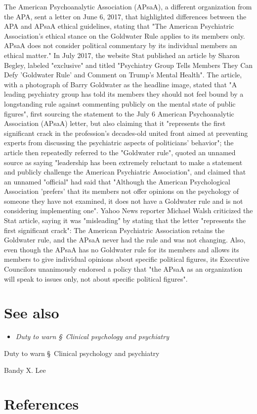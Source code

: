 The American Psychoanalytic Association (APsaA), a different
organization from the APA, sent a letter on June 6, 2017, that
highlighted differences between the APA and APsaA ethical guidelines,
stating that "The American Psychiatric Association's ethical stance on
the Goldwater Rule applies to its members only. APsaA does not consider
political commentary by its individual members an ethical matter." In
July 2017, the website Stat published an article by Sharon Begley,
labeled "exclusive" and titled "Psychiatry Group Tells Members They Can
Defy 'Goldwater Rule' and Comment on Trump's Mental Health". The
article, with a photograph of Barry Goldwater as the headline image,
stated that "A leading psychiatry group has told its members they should
not feel bound by a longstanding rule against commenting publicly on the
mental state of public figures", first sourcing the statement to the
July 6 American Psychoanalytic Association (APsaA) letter, but also
claiming that it "represents the first significant crack in the
profession's decades-old united front aimed at preventing experts from
discussing the psychiatric aspects of politicians' behavior"; the
article then repeatedly referred to the "Goldwater rule", quoted an
unnamed source as saying "leadership has been extremely reluctant to
make a statement and publicly challenge the American Psychiatric
Association", and claimed that an unnamed "official" had said that
"Although the American Psychological Association 'prefers' that its
members not offer opinions on the psychology of someone they have not
examined, it does not have a Goldwater rule and is not considering
implementing one". Yahoo News reporter Michael Walsh criticized the Stat
article, saying it was "misleading" by stating that the letter
"represents the first significant crack": The American Psychiatric
Association retains the Goldwater rule, and the APsaA never had the rule
and was not changing. Also, even though the APsaA has no Goldwater rule
for its members and allows its members to give individual opinions about
specific political figures, its Executive Councilors unanimously
endorsed a policy that "the APsaA as an organization will speak to
issues only, not about specific political figures".

\section{See also}\label{see-also}

\begin{itemize}
\item
  \emph{Duty to warn §~Clinical psychology and psychiatry}
\end{itemize}

Duty to warn §~Clinical psychology and psychiatry

Bandy X. Lee

\section{References}\label{references}
